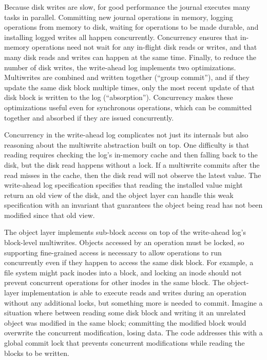 Because disk writes are slow, for good performance the journal executes many
tasks in parallel. Committing new journal operations in memory, logging operations
from memory to disk, waiting for operations to be made durable, and
installing logged writes all happen concurrently.  Concurrency ensures that
in-memory operations
need not wait for any in-flight disk reads or writes, and that many
disk reads and writes can happen at the same time.  Finally, to reduce the
number of disk writes, the write-ahead log implements two optimizations.
Multiwrites are combined and written
together (``group commit''), and if they update the same disk
block multiple times, only the most recent update of that disk block is
written to the log (``absorption''). Concurrency makes these optimizations
useful even for synchronous operations, which can be committed together and
absorbed if they are issued concurrently.

Concurrency in the write-ahead log complicates not just its internals but also
reasoning about the multiwrite abstraction built on top. One difficulty is that
reading requires checking the log's in-memory cache and then falling back to the disk,
but the disk read happens without a lock. If a multiwrite commits after the read
misses in the cache, then the disk read will not observe the latest value. The
write-ahead log specification specifies that reading the installed value might return an
old view of the disk, and the object layer can handle this weak specification with
an invariant that guarantees the object being read has not been modified since
that old view.

The object layer implements sub-block access on top of the write-ahead
log's block-level multiwrites. Objects accessed by an operation must be locked,
so supporting fine-grained access is necessary to allow operations to run
concurrently even if they happen to access the same disk block. For example, a
file system might pack inodes into a block, and locking an inode should not
prevent concurrent operations for other inodes in the same block. The
object-layer implementation is able to execute reads and writes during an
operation without any additional locks, but something more is needed to commit.
Imagine a situation where between reading some disk block and writing it an
unrelated object was modified in the same block; committing the modified block
would overwrite the concurrent modification, losing data. The code addresses
this with a global commit lock that prevents concurrent modifications while
reading the blocks to be written.

